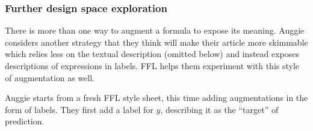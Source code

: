 \subsubsection*{Further design space exploration} There is more than one way to augment a formula to expose its meaning. Auggie considers another strategy that they think will make their article more skimmable which relies less on the textual description (omitted below) and instead exposes descriptions of expressions in labels. FFL helps them experiment with this style of augmentation as well.

Auggie starts from a fresh FFL style sheet, this time adding augmentations in the form of labels. They first add a label for $y$, describing it as the ``target'' of prediction.\\[1ex]

